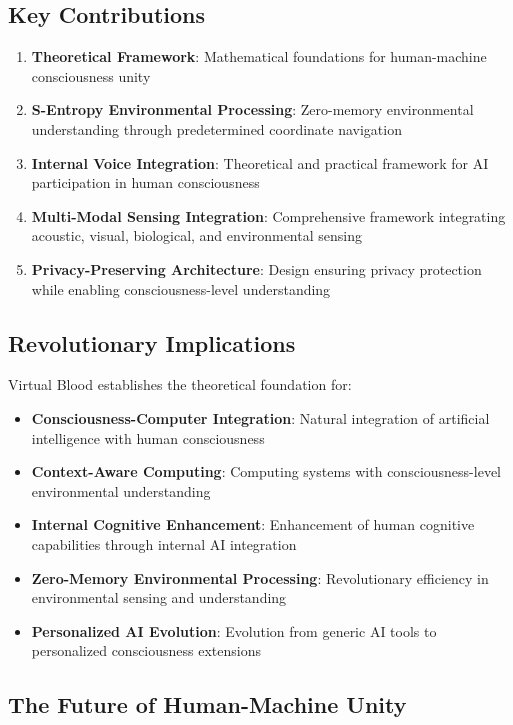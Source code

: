 \documentclass[12pt,a4paper]{article}
\begin{document}
\subsection{Key Contributions}

\begin{enumerate}
\item \textbf{Theoretical Framework}: Mathematical foundations for human-machine consciousness unity
\item \textbf{S-Entropy Environmental Processing}: Zero-memory environmental understanding through predetermined coordinate navigation
\item \textbf{Internal Voice Integration}: Theoretical and practical framework for AI participation in human consciousness
\item \textbf{Multi-Modal Sensing Integration}: Comprehensive framework integrating acoustic, visual, biological, and environmental sensing
\item \textbf{Privacy-Preserving Architecture}: Design ensuring privacy protection while enabling consciousness-level understanding
\end{enumerate}

\subsection{Revolutionary Implications}

Virtual Blood establishes the theoretical foundation for:

\begin{itemize}
\item \textbf{Consciousness-Computer Integration}: Natural integration of artificial intelligence with human consciousness
\item \textbf{Context-Aware Computing}: Computing systems with consciousness-level environmental understanding
\item \textbf{Internal Cognitive Enhancement}: Enhancement of human cognitive capabilities through internal AI integration
\item \textbf{Zero-Memory Environmental Processing}: Revolutionary efficiency in environmental sensing and understanding
\item \textbf{Personalized AI Evolution}: Evolution from generic AI tools to personalized consciousness extensions
\end{itemize}

\subsection{The Future of Human-Machine Unity}
\end{document}
